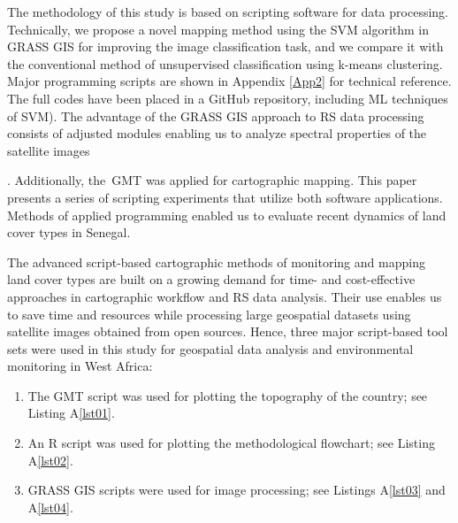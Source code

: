 \documentclass[earth,article,accept,pdftex,moreauthors]{Definitions/mdpi}
\begin{document}
The methodology of this study {is based on}{ }scripting software for data processing{. Technically, we propose a novel mapping method using the SVM algorithm in GRASS GIS for improving the image classification task, and we compare it with the conventional method of unsupervised classification using k-means clustering. Major }programming scripts {are} shown in Appendix \ref{App2} for technical reference{. }{The} full codes have been placed in a GitHub repository, including {ML} techniques of {SVM)}. {The} advantage of the GRASS GIS approach {to RS data processing consists of}{ }adjusted modules {enabling us }to analyze{ }spectral properties of the {satellite }images{. Additionally, the~{GMT} {was applied for }cartographic{ }mapping{. This paper presents a series of scripting experiments that utilize both software applications. Methods of{ }applied programming enabled us to evaluate {recent} dynamics of} land cover {types} in Senegal{.} 

The advanced script-based cartographic methods of monitoring and mapping land cover types are built on a growing demand for  time- and cost-effective approaches in cartographic workflow and {RS} data analysis{. Their use enables us} to save time and resources while processing {large }geospatial datasets{ using }satellite images {obtained from  open sources}. Hence, three major script-based tool sets were used in this study for geospatial data analysis and environmental monitoring in West Africa:

 \begin{enumerate}
        \item The GMT script was used for plotting the topography of the country; see Listing A\ref{lst01}.  
        \item An R script was used for plotting the methodological flowchart; see Listing A\ref{lst02}. 
         \item GRASS GIS {scripts were} used for image processing; see {Listings} A\ref{lst03} and A\ref{lst04}.
  \end{enumerate}       

}
\end{document}
